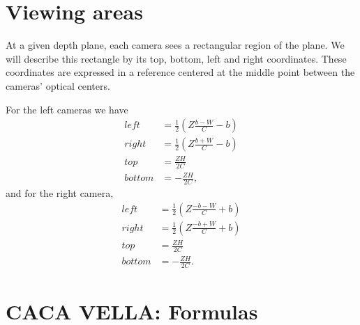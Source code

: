 \documentclass[12pt,a4paper]{article}
\begin{document}
\section{Viewing areas}
At a given depth plane, each camera sees a rectangular region of the plane.  We will describe this rectangle by its top, bottom, left and right coordinates. These coordinates are expressed in a reference centered at the middle point between the cameras' optical centers.

For the left cameras we have
\begin{equation}
 \begin{split}
  left &= \frac{1}{2} \left( Z \frac{b - W}{C} - b\right) \\
  right &= \frac{1}{2} \left( Z \frac{b + W}{C} - b\right) \\
  top &= \frac{Z H}{2 C} \\
  bottom &= -\frac{Z H}{2 C} ,
 \end{split}
\end{equation}
and for the right camera,
\begin{equation}
 \begin{split}
  left &= \frac{1}{2} \left( Z \frac{-b - W}{C} + b\right) \\
  right &= \frac{1}{2} \left( Z \frac{-b + W}{C} + b\right) \\
  top &= \frac{Z H}{2 C} \\
  bottom &= -\frac{Z H}{2 C} .
 \end{split}
\end{equation}



\section{CACA VELLA: Formulas}
\end{document}
